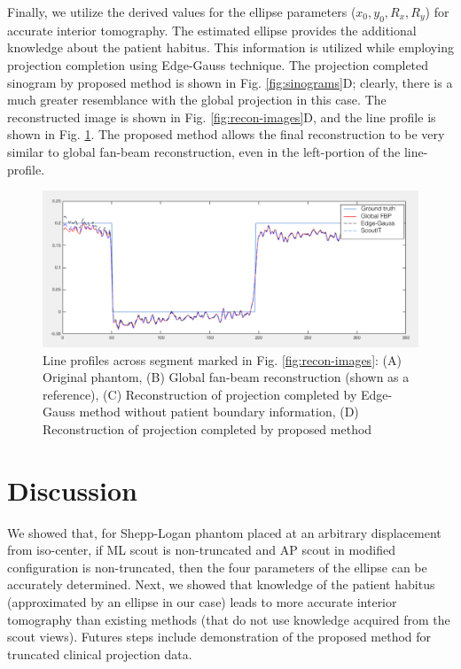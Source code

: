 \documentclass[]{spie}
\begin{document}
Finally, we utilize the derived values for the ellipse parameters ($x_0, y_0, R_x, R_y$) for accurate interior tomography. The estimated ellipse provides the additional knowledge about the patient habitus. This information is utilized while employing projection completion using Edge-Gauss technique. The projection completed sinogram by proposed method is shown in Fig. \ref{fig:sinograms}D; clearly, there is a much greater resemblance with the global projection in this case. The reconstructed image is shown in Fig. \ref{fig:recon-images}D, and the line profile is shown in Fig. \ref{fig:lineprofiles}. The proposed method allows the final reconstruction to be very similar to global fan-beam reconstruction, even in the left-portion of the line-profile. 

\begin{figure}[hbtp]
\centering
\includegraphics[width=15 cm]{figures/figuresScoutIT-lineprofiles}
\caption{Line profiles across segment marked in Fig. \ref{fig:recon-images}: (A) Original phantom, (B) Global fan-beam reconstruction (shown as a reference), (C) Reconstruction of projection completed by Edge-Gauss method without patient boundary information, (D) Reconstruction of projection completed by proposed method \label{fig:lineprofiles}}
\end{figure}




\section{Discussion}

We showed that, for Shepp-Logan phantom placed at an arbitrary displacement from iso-center, if ML scout is non-truncated and AP scout in modified configuration is non-truncated, then the four parameters of the ellipse can be accurately determined. Next, we showed that knowledge of the patient habitus (approximated by an ellipse in our case) leads to more accurate interior tomography than existing methods (that do not use knowledge acquired from the scout views). Futures steps include demonstration of the proposed method for truncated clinical projection data.
\end{document}
